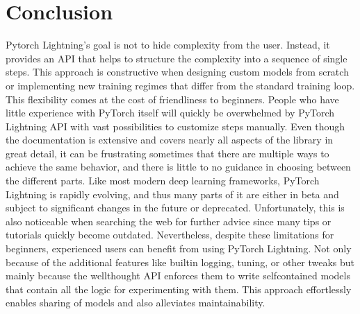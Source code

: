 \documentclass[letterpaper,10pt,english]{jupyterBook}
\begin{document}
\section{Conclusion}
\label{\detokenize{PyTorchLightning:conclusion}}
\sphinxAtStartPar
Pytorch Lightning’s goal is not to hide complexity from the user. Instead, it provides an API that helps to structure the complexity into a sequence of single steps.
This approach is constructive when designing custom models from scratch or implementing new training regimes that differ from the standard training loop.
This flexibility comes at the cost of friendliness to beginners. People who have little experience with PyTorch itself will quickly be overwhelmed by PyTorch Lightning API with vast possibilities to customize steps manually.
Even though the documentation is extensive and covers nearly all aspects of the library in great detail, it can be frustrating sometimes that there are multiple ways to achieve the same behavior, and there is little to no guidance in choosing between the different parts.
Like most modern deep learning frameworks, PyTorch Lightning is rapidly evolving, and thus many parts of it are either in beta and subject to significant changes in the future or deprecated. Unfortunately, this is also noticeable when searching the web for further advice since many tips or tutorials quickly become outdated.
Nevertheless, despite these limitations for beginners, experienced users can benefit from using PyTorch Lightning. Not only because of the additional features like built\sphinxhyphen{}in logging, tuning, or other tweaks but mainly because the well\sphinxhyphen{}thought API enforces them to write self\sphinxhyphen{}contained models that contain all the logic for experimenting with them.
This approach effortlessly enables sharing of models and also alleviates maintainability.
\end{document}
